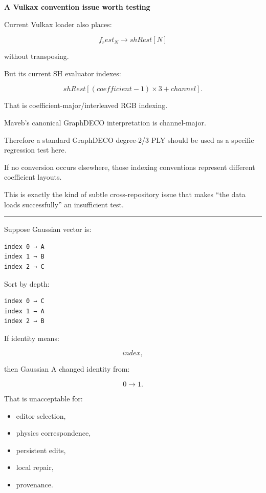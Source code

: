 \textbf{A Vulkax convention issue worth testing}

Current Vulkax loader also places:

\[
f_rest_N
\rightarrow
shRest[N]
\]

without transposing.

But its current SH evaluator indexes:

\[
shRest[
(coefficient-1)\times3
+
channel
].
\]

That is coefficient-major/interleaved RGB indexing.

Maveb's canonical GraphDECO interpretation is channel-major.

Therefore a standard GraphDECO degree-2/3 PLY should be used as a specific regression test here.

If no conversion occurs elsewhere, those indexing conventions represent different coefficient layouts.

This is exactly the kind of subtle cross-repository issue that makes ``the data loads successfully'' an insufficient test.

\begin{center}\rule{0.5\linewidth}{0.5pt}\end{center}

Suppose Gaussian vector is:

\protect{}\label{e6vf6b}%
\begin{verbatim}
index 0 → A
index 1 → B
index 2 → C
\end{verbatim}

Sort by depth:

\protect{}\label{riprkz}%
\begin{verbatim}
index 0 → C
index 1 → A
index 2 → B
\end{verbatim}

If identity means:

\[
index,
\]

then Gaussian A changed identity from:

\[
0\rightarrow1.
\]

That is unacceptable for:

\begin{itemize}
\tightlist
\item
  editor selection,
\item
  physics correspondence,
\item
  persistent edits,
\item
  local repair,
\item
  provenance.
\end{itemize}

